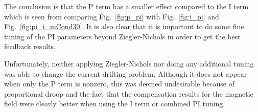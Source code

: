 
The conclusion is that the P term has a smaller effect compared to the
I term which is seen from comparing Fig.~\ref{fig:p_pi} with
Fig.~\ref{fig:i_pi} and Fig.~\ref{fig:pi_i_mCond30}.  It is also clear
that it is important to do some fine tuning of the PI parameters
beyond Ziegler-Nichols in order to get the best feedback results.

Unfortunately, neither applying Ziegler-Nichols nor doing any
additional tuning was able to change the current drifting problem.
Although it does not appear when only the P term is nonzero, this was
deemed undesirable because of proportional droop and the fact that the
compensation results for the magnetic field were clearly better when
using the I term or combined PI tuning.

